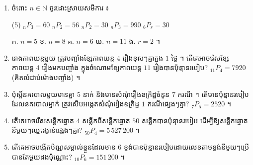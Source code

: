 \begin{enumerate}[1]
\begin{enumerate}[a]
  \end{enumerate}
  \ans
  ក. $4$; $720$; $504$; $\dfrac{1}{n}$; $n(n - 1)(n - 2)$; $n^2(n - 1)$ \quad ខ. $360$; $60$; $5040$ ។
  \item ចំពោះ $n \in \mathbb{N}$ ចូរដោះស្រាយសមីការ ៖
  \begin{tasks}(5)
    \task ${}_nP_3 = 60$
    \task ${}_nP_2 = 56$
    \task ${}_nP_2 = 30$
    \task ${}_nP_3 = 990$
    \task ${}_6P_r = 30$
  \end{tasks}
  \ans
  ក. $n = 5$ \quad ខ. $n = 8$ \quad គ. $n = 6$ \quad ឃ. $n = 11$ \quad ង. $r = 2$ ។
  \item រោងភាពយន្តមួយ ត្រូវបញ្ចាំងខ្សែភាពយន្ត $4$ រឿងខុសៗគ្នាក្នុង $1$ ថ្ងៃ ។ តើគេអាចរើសខ្សែភាពយន្ត $4$ រឿងមកបញ្ចាំង ក្នុងចំណោមខ្សែភាពយន្ត $11$ រឿងបានប៉ុន្មានរបៀប?
  \ans
  ${}_{11}P_4 = 7920$ (គិតលំដាប់ម៉ោងបញ្ចាំង) ។
  \item ប៉ុស្តិ៍នគរបាលមួយមានគ្នា $5$ នាក់ និងមានសំណុំរឿងឧក្រិដ្ឋចំនួន $7$ ករណី ។ តើមានប៉ុន្មានរបៀបដែលនគរបាលម្នាក់ ត្រូវសើបអង្កេតសំណុំរឿងឧក្រិដ្ឋ $1$ ករណីផ្សេងៗគ្នា?
  \ans
  ${}_7P_5 = 2520$ ។
  \item តើគេអាចរើសសន្លឹកឆ្នោត $4$ សន្លឹកពីសន្លឹកឆ្នោត $50$ សន្លឹកបានប៉ុន្មានរបៀប ដើម្បីឱ្យសន្លឹកឆ្នោតនីមួយៗឈ្នះរង្វាន់ផ្សេងៗគ្នា?
  \ans
  ${}_{50}P_4 = 5\,527\,200$ ។
  \item តើគេអាចបង្កើតប័ណ្ណសម្គាល់ខ្លួនដែលមាន $6$ ខ្ទង់បានប៉ុន្មានរបៀបដោយលេខតាមខ្ទង់នីមួយៗប្រើបានតែមួយដងប៉ុណ្ណោះ?
  \ans
  ${}_{10}P_6 = 151\,200$ ។
\end{enumerate}
